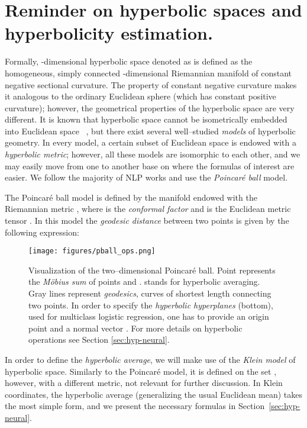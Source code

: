 \documentclass[10pt,twocolumn,letterpaper]{article}
\begin{document}
 \section{Reminder on hyperbolic spaces and hyperbolicity estimation.}\label{sec:pball}
Formally, -dimensional hyperbolic space denoted as  is defined as the homogeneous, simply connected -dimensional Riemannian manifold of constant negative sectional curvature. The property of constant negative curvature makes it analogous to the ordinary Euclidean sphere (which has constant positive curvature); however, the geometrical properties of the hyperbolic space are very different. It is known that hyperbolic space cannot be isometrically embedded into Euclidean space ~\cite{krioukov2010hyperbolic,linial1998low}, but there exist several well--studied \emph{models} of hyperbolic geometry. In every model, a certain subset of Euclidean space is endowed with a \emph{hyperbolic metric}; however, all these models are isomorphic to each other, and we may easily move from one to another base on where the formulas of interest are easier. We follow the majority of NLP works and use the \textit{Poincar\'e ball} model. 


The Poincar\'e ball model  is defined by the manifold  endowed with the Riemannian metric , where  is the \emph{conformal factor} and  is the Euclidean metric tensor . In this model the \emph{geodesic distance} between two points is given by the following expression:


\begin{figure}[htb!]
    \centering
    \texttt{[image: figures/pball\_ops.png]}
    \caption{Visualization of the two--dimensional Poincar\'e ball. Point  represents the \emph{M\"obius sum} of points  and .  stands for hyperbolic averaging. Gray lines represent \emph{geodesics}, curves of shortest length connecting two points. In order to specify the \emph{hyperbolic hyperplanes} (bottom), used for multiclass logistic regression, one has
    to provide an origin point  and a normal vector .
    For more details on hyperbolic operations see Section \ref{sec:hyp-neural}.
    }
    \label{fig:pball_2d}
\end{figure}

In order to define the \emph{hyperbolic average}, we will make use of the \emph{Klein model} of hyperbolic space. Similarly to the Poincar\'e model, it is defined on the set \mbox{}, however, with a different metric, not relevant for further discussion. In Klein coordinates, the hyperbolic average (generalizing the usual Euclidean mean) takes the most simple form, and we present the necessary formulas in Section~\ref{sec:hyp-neural}.
\end{document}
